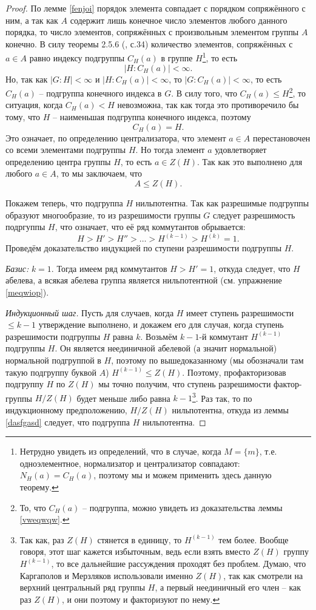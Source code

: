 \documentclass{article}
\begin{document}
\begin{proof}
    По лемме \ref{fenjoi} порядок элемента совпадает с порядком сопряжённого с ним, а так как $A$ содержит лишь конечное число элементов любого данного порядка, то число элементов, сопряжённых с произвольным элементом группы $A$ конечно. В силу теоремы 2.5.6 (\cite{kargapolov}, с.34) количество элементов, сопряжённых с $a \in A$ равно индексу подгруппы $C_H(a)$  в группе $H$\footnote{Нетрудно увидеть из определений, что в случае, когда $M = \{ m \}$, т.е. одноэлементное, нормализатор и централизатор совпадают: $N_H(a) = C_H(a)$, поэтому мы и можем применить здесь данную теорему.}, то есть $$ |H : C_H(a)| < \infty. $$
    Но, так как $|G:H| < \infty $ и $|H: C_H(a)| < \infty$, то $|G:C_H(a)| < \infty$, то есть $C_H(a)$ -- подгруппа конечного индекса в $G$. В силу того, что $C_H(a) \leqslant H$\footnote{То, что $C_H(a)$ -- подгруппа, можно увидеть из доказательства леммы \ref{vweqwqw}.}, то ситуация, когда $C_H(a) < H$ невозможна, так как тогда это противоречило бы тому, что $H$ -- наименьшая подгруппа конечного индекса, поэтому $$ C_H(a) = H. $$
    Это означает, по определению централизатора, что элемент $a \in A$ перестановочен со всеми элементами подгруппы $H$. Но тогда элемент $a$ удовлетворяет определению центра группы $H$, то есть $a \in Z(H)$. Так как это выполнено для любого $a \in A$, то мы заключаем, что $$ A \leqslant Z(H). $$

    Покажем теперь, что подгруппа $H$ нильпотентна. Так как разрешимые подгруппы образуют многообразие, то из разрешимости группы $G$ следует разрешимость подргуппы $H$, что означает, что её ряд коммутантов обрывается:
    \[
        H > H' > H'' > \ldots > H^{(k - 1)} > H^{(k)} = 1.
    \]
    Проведём доказательство индукцией по ступени разрешимости подгруппы $H$.

    \textit{Базис:} $k = 1$. Тогда имеем ряд коммутантов $H > H' = 1$, откуда следует, что $H$ абелева, а всякая абелева группа является нильпотентной (см. упражнение \ref{meqwiop}).

    \textit{Индукционный шаг.} Пусть для случаев, когда $H$ имеет ступень разрешимости $\leqslant k - 1$ утверждение выполнено, и докажем его для случая, когда ступень разрешимости подгруппы $H$ равна $k$.
    Возьмём $k - 1$-й коммутант $H^{(k - 1)}$ подгруппы $H$. Он является неединичной абелевой (а значит нормальной) нормальной подгруппой в $H$, поэтому по вышедоказанному (мы обозначали там такую подгруппу буквой $A$) $ H^{(k - 1)} \leqslant Z(H) $. Поэтому, профакторизовав подгруппу $H$ по $Z(H)$ мы точно получим, что ступень разрешимости фактор-группы $H / Z(H)$ будет меньше либо равна $k-1$\footnote{Так как, раз $Z(H)$ стянется в единицу, то $H^{(k - 1)}$ тем более. Вообще говоря, этот шаг кажется избыточным, ведь если взять вместо $Z(H)$ группу $H^{(k - 1)}$, то все дальнейшие рассуждения проходят без проблем. Думаю, что Каргаполов и Мерзляков использовали именно $Z(H)$, так как смотрели на верхний центральный ряд группы $H$, а первый неединичный его член -- как раз $Z(H)$, и они поэтому и факторизуют по нему.}. Раз так, то по индукционному предположению, $H / Z(H)$ нильпотентна, откуда из леммы \ref{dasfgasd} следует, что подгруппа $H$ нильпотентна.


\end{proof}
\end{document}

